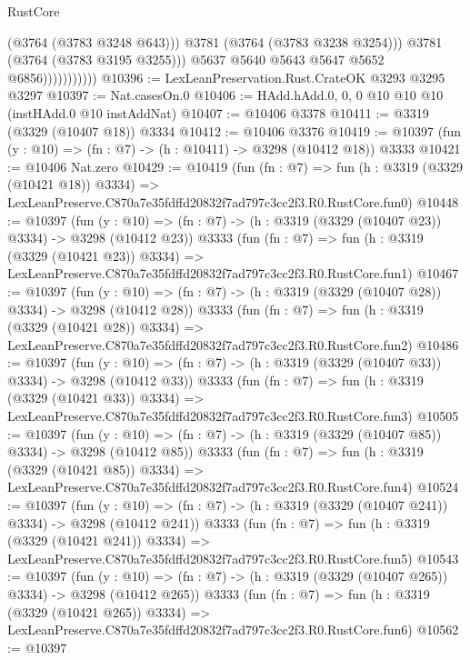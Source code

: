 \begin{lexlean}{RustCore}
\begin{coremodule}
                                (@3764 (@3783 @3248 @643)))
                              @3781
                              (@3764 (@3783 @3238 @3254)))
                            @3781
                            (@3764 (@3783 @3195 @3255)))
                          @5637
                          @5640
                          @5643
                          @5647
                          @5652
                          @6856)))))))))))
@10396 := LexLeanPreservation.Rust.CrateOK @3293 @3295 @3297
@10397 := Nat.casesOn.{0}
@10406 := HAdd.hAdd.{0, 0, 0} @10 @10 @10 (instHAdd.{0} @10 instAddNat)
@10407 := @10406 @3378
@10411 := @3319 (@3329 (@10407 @18)) @3334
@10412 := @10406 @3376
@10419 := @10397 (fun (y : @10) => (fn : @7) -> (h : @10411) -> @3298 (@10412 @18)) @3333
@10421 := @10406 Nat.zero
@10429 := @10419
    (fun (fn : @7) =>
    fun (h : @3319 (@3329 (@10421 @18)) @3334) =>
    LexLeanPreserve.C870a7e35fdffd20832f7ad797c3cc2f3.R0.RustCore.fun0)
@10448 := @10397
    (fun (y : @10) => (fn : @7) -> (h : @3319 (@3329 (@10407 @23)) @3334) -> @3298 (@10412 @23))
    @3333
    (fun (fn : @7) =>
    fun (h : @3319 (@3329 (@10421 @23)) @3334) =>
    LexLeanPreserve.C870a7e35fdffd20832f7ad797c3cc2f3.R0.RustCore.fun1)
@10467 := @10397
    (fun (y : @10) => (fn : @7) -> (h : @3319 (@3329 (@10407 @28)) @3334) -> @3298 (@10412 @28))
    @3333
    (fun (fn : @7) =>
    fun (h : @3319 (@3329 (@10421 @28)) @3334) =>
    LexLeanPreserve.C870a7e35fdffd20832f7ad797c3cc2f3.R0.RustCore.fun2)
@10486 := @10397
    (fun (y : @10) => (fn : @7) -> (h : @3319 (@3329 (@10407 @33)) @3334) -> @3298 (@10412 @33))
    @3333
    (fun (fn : @7) =>
    fun (h : @3319 (@3329 (@10421 @33)) @3334) =>
    LexLeanPreserve.C870a7e35fdffd20832f7ad797c3cc2f3.R0.RustCore.fun3)
@10505 := @10397
    (fun (y : @10) => (fn : @7) -> (h : @3319 (@3329 (@10407 @85)) @3334) -> @3298 (@10412 @85))
    @3333
    (fun (fn : @7) =>
    fun (h : @3319 (@3329 (@10421 @85)) @3334) =>
    LexLeanPreserve.C870a7e35fdffd20832f7ad797c3cc2f3.R0.RustCore.fun4)
@10524 := @10397
    (fun (y : @10) => (fn : @7) -> (h : @3319 (@3329 (@10407 @241)) @3334) -> @3298 (@10412 @241))
    @3333
    (fun (fn : @7) =>
    fun (h : @3319 (@3329 (@10421 @241)) @3334) =>
    LexLeanPreserve.C870a7e35fdffd20832f7ad797c3cc2f3.R0.RustCore.fun5)
@10543 := @10397
    (fun (y : @10) => (fn : @7) -> (h : @3319 (@3329 (@10407 @265)) @3334) -> @3298 (@10412 @265))
    @3333
    (fun (fn : @7) =>
    fun (h : @3319 (@3329 (@10421 @265)) @3334) =>
    LexLeanPreserve.C870a7e35fdffd20832f7ad797c3cc2f3.R0.RustCore.fun6)
@10562 := @10397

\end{coremodule}
\end{lexlean}
